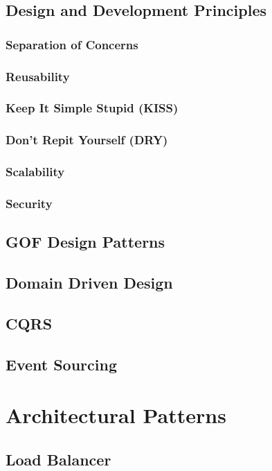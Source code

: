 \documentclass[a4paper]{article}
\begin{document}
    \subsection{Design and Development Principles}
    \subsubsection{Separation of Concerns}
    \subsubsection{Reusability}
    \subsubsection{Keep It Simple Stupid (KISS)}
    \subsubsection{Don't Repit Yourself (DRY)}
    \subsubsection{Scalability}
    \subsubsection{Security}

    \subsection{GOF Design Patterns}
    \subsection{Domain Driven Design}
    \subsection{CQRS}
    \subsection{Event Sourcing}

    \newpage
    \section{Architectural Patterns}
    \subsection{Load Balancer}
\end{document}
